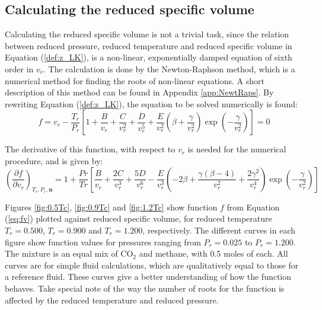 \documentclass[english]{../thermomemo/thermomemo}
\numberwithin{equation}{section}
\newcommand*{\pder}[2]{\left(\frac{\partial #1}{\partial #2}\right)}
\newcommand*{\reff}[1]{(\ref{#1})}
\begin{document}
\subsection{Calculating the reduced specific volume}
\label{subsec:v_r}
Calculating the reduced specific volume is not a trivial task, since the relation between reduced pressure, reduced temperature and reduced specific volume in Equation \reff{def:z_LK}, is a non-linear, exponentially damped equation of sixth order in $v_r$. The calculation is done by the Newton-Raphson method, which is a numerical method for finding the roots of non-linear equations. A short description of this method can be found in Appendix \ref{app:NewtRaps}. By rewriting Equation \reff{def:z_LK}, the equation to be solved numerically is found:
\begin{equation}
\label{eq:fv}
f = v_r - \frac{T_r}{P_r} \left[1 + \frac{B}{v_r} + \frac{C}{v_r^2} + \frac{D}{v_r^5} + \frac{E}{v_r^2} \left( \beta + \frac{\gamma}{v_r^2} \right) \exp{\left(-\frac{\gamma}{v_r^2}\right)} \right] = 0
\end{equation}

The derivative of this function, with respect to $v_r$ is needed for the numerical procedure, and is given by:
\begin{equation}
\label{eq:fv_vr}
\pder{f}{v_r}_{T_r,P_r, \textbf{n}} = 1 + \frac{Pr}{Tr} \left[ \frac{B}{v_r} + \frac{2C}{v_r^3} + \frac{5D}{v_r^6} - \frac{E}{v_r^3}  \left(-2 \beta + \frac{\gamma (\beta - 4)}{v_r^2} + \frac{2 \gamma^2}{v_r^4} \right) \exp \left(- \frac{\gamma}{v_r^2} \right) \right]
\end{equation}

Figures \ref{fig:0.5Tc}, \ref{fig:0.9Tc} and \ref{fig:1.2Tc} show function $f$ from Equation \reff{eq:fv} plotted against reduced specific volume, for reduced temperature $T_r = 0.500$, $T_r = 0.900$ and $T_r = 1.200$, respectively. The different curves in each figure show function values for pressures ranging from $P_r = 0.025$ to $P_r = 1.200$. The mixture is an equal mix of CO$_2$ and methane, with 0.5 moles of each. All curves are for simple fluid calculations, which are qualitatively equal to those for a reference fluid. These curves give a better understanding of how the function behaves. Take special note of the way the number of roots for the function is affected by the reduced temperature and reduced pressure.
\end{document}
